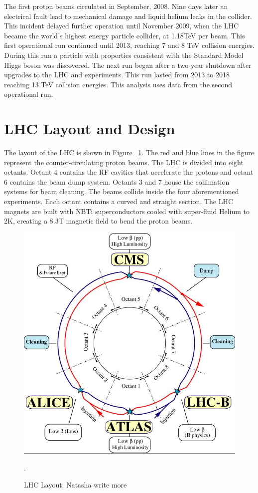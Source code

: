 The first proton beams circulated in September, 2008. Nine days later an electrical fault lead to mechanical damage and liquid helium leaks in the collider. This incident delayed further operation until November 2009, when the LHC became the world's highest energy particle collider, at 1.18TeV per beam. This first operational run continued until 2013, reaching 7 and 8 TeV collision energies. During this run a particle with properties consistent with the Standard Model Higgs boson was discovered. The next run began after a two year shutdown after upgrades to the LHC and experiments. This run lasted from 2013 to 2018 reaching 13 TeV collision energies. This analysis uses data from the second operational run. 
\section{LHC Layout and Design}
The layout of the LHC is shown in Figure ~\ref{fig:lhc_layout}. The red and blue lines in the figure represent the counter-circulating proton beams. The LHC is divided into eight octants.  Octant 4 contains the RF cavities that accelerate the protons and octant 6 contains the beam dump system. Octants 3 and 7 house the collimation systems for beam cleaning. The beams collide inside the four aforementioned experiments. Each octant contains a curved and straight section. The LHC magnets are built with NBTi superconductors cooled with super-fluid Helium to 2K, creating a 8.3T magnetic field to bend the proton beams.


\begin{figure}[h!]
  \centering
  \includegraphics[width=\hsize]{figures/Detector/lhc.jpg}
  \caption{LHC Layout. Natasha write more}. 
  \label{fig:lhc_layout}
\end{figure}
\FloatBarrier


